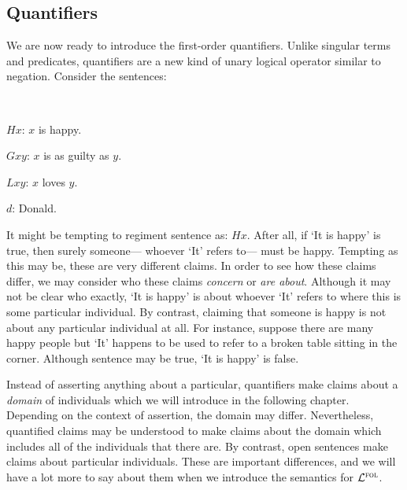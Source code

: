 \subsection{Quantifiers}

We are now ready to introduce the first-order quantifiers.
Unlike singular terms and predicates, quantifiers are a new kind of unary logical operator similar to negation.
Consider the sentences:%

\begin{multicols}{2}
  
\begin{earg} \label{quant}
  \item[] ~
\end{earg}


\begin{ekey}
  \item[$Hx$:] $x$ is happy.
  \item[$Gxy$:] $x$ is as guilty as $y$.
  \item[$Lxy$:] $x$ loves $y$.
  \item[$d$:] Donald.
\end{ekey}

\end{multicols}

It might be tempting to regiment sentence  as: $Hx$.
After all, if `It is happy' is true, then surely someone--- whoever `It' refers to--- must be happy.
Tempting as this may be, these are very different claims.
In order to see how these claims differ, we may consider who these claims \textit{concern} or \textit{are about}.
Although it may not be clear who exactly, `It is happy' is about whoever `It' refers to where this is some particular individual.
By contrast, claiming that someone is happy is not about any particular individual at all.
For instance, suppose there are many happy people but `It' happens to be used to refer to a broken table sitting in the corner.
Although sentence  may be true, `It is happy' is false.

Instead of asserting anything about a particular, quantifiers make claims about a \textit{domain} of individuals which we will introduce in the following chapter.
Depending on the context of assertion, the domain may differ.
Nevertheless, quantified claims may be understood to make claims about the domain which includes all of the individuals that there are.
By contrast, open sentences make claims about particular individuals.
These are important differences, and we will have a lot more to say about them when we introduce the semantics for $\mathcal{L}^{\textsc{fol}}$.

